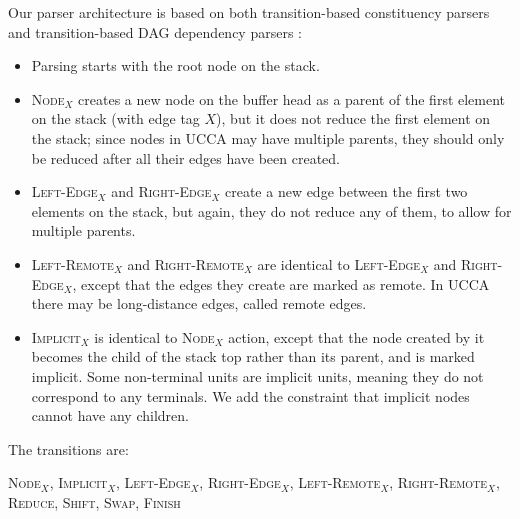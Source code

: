 \documentclass[11pt]{article}
\begin{document}
Our parser architecture is based on both transition-based constituency parsers \cite{zhu2013fast,maier2015discontinuous} and transition-based DAG dependency parsers \cite{sagae2008shift,tokgoz2015transition}:

\begin{itemize}
	\item Parsing starts with the root node on the stack.
	\item \textsc{Node$_X$} creates a new node on the buffer head as a parent of the first element on the stack (with edge tag $X$), but it does not reduce the first element on the stack; since nodes in UCCA may have multiple parents, they should only be reduced after all their edges have been created.
	\item \textsc{Left-Edge$_X$} and \textsc{Right-Edge$_X$} create a new edge between the first two elements on the stack, but again, they do not reduce any of them, to allow for multiple parents.
	\item \textsc{Left-Remote$_X$} and \textsc{Right-Remote$_X$} are identical to \textsc{Left-Edge$_X$} and \textsc{Right-Edge$_X$}, except that the edges they create are marked as remote. In UCCA there may be long-distance edges, called remote edges.
	\item \textsc{Implicit$_X$} is identical to \textsc{Node$_X$} action, except that the node created by it becomes the child of the stack top rather than its parent, and is marked implicit. Some non-terminal units are implicit units, meaning they do not correspond to any terminals. We add the constraint that implicit nodes cannot have any children.
\end{itemize}

The transitions are:

\textsc{Node$_X$, Implicit$_X$, Left-Edge$_X$, Right-Edge$_X$, Left-Remote$_X$, Right-Remote$_X$, Reduce, Shift, Swap, Finish}
\end{document}
